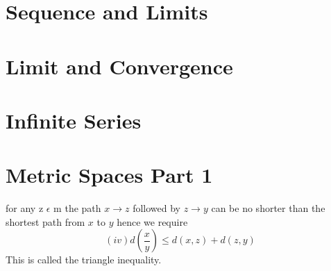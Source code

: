 \documentclass[10pt,a4paper]{article}
\begin{document}



\section{Sequence and Limits}



\section{Limit and Convergence}




\section{Infinite Series}






\section{Metric Spaces Part 1}


\newpage
for any z $\epsilon$ m the path $x \rightarrow z$ followed by $z \rightarrow y$ can be no shorter than the shortest path from $x$ to $y$ hence we require $$(iv)d (\frac{x}{y}) \leq d(x,z) + d(z,y)$$ This is called the triangle inequality.
 
\end{document}
